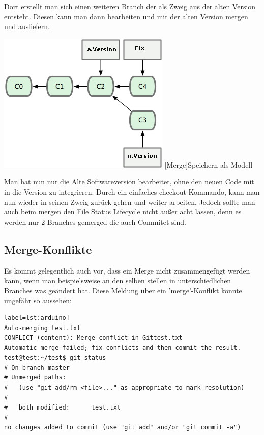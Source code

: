 \documentclass[12pt,a4paper,bibliography=totocnumbered,listof=totocnumbered]{scrartcl}
\begin{document}
Dort erstellt man sich einen weiteren Branch der als Zweig aus der alten Version entsteht. Diesen kann man dann bearbeiten und mit der alten Version mergen und ausliefern.
 
\vspace{1em}
\begin{minipage}{\linewidth}
	\centering
	\includegraphics[width=0.6\linewidth]{Bilder/merge-fix.png}
	[Merge]{Speichern als Modell\footnotemark }
	\label{Speichern als Modell}
\end{minipage}

Man hat nun nur die Alte Softwareversion bearbeitet, ohne den neuen Code 
mit in die Version zu integrieren. Durch ein einfaches checkout Kommando, kann man nun wieder in seinen Zweig zurück gehen und weiter arbeiten. Jedoch sollte man auch beim mergen den File Status Lifecycle nicht außer acht lassen, denn es werden nur 2 Branches gemerged die auch Commitet sind.

\subsection{Merge-Konflikte}
Es kommt gelegentlich auch vor, dass ein Merge nicht zusammengefügt werden kann, wenn man beispielsweise an den selben stellen in unterschiedlichen Branches was geändert hat.	
Diese Meldung über ein 'merge'-Konflikt könnte ungefähr so aussehen:

\begin{lstlisting}[caption=Branch Konfilkt] label=lst:arduino]
Auto-merging test.txt
CONFLICT (content): Merge conflict in Gittest.txt
Automatic merge failed; fix conflicts and then commit the result.
test@test:~/test$ git status
# On branch master
# Unmerged paths:
#   (use "git add/rm <file>..." as appropriate to mark resolution)
#
#	both modified:      test.txt
#
no changes added to commit (use "git add" and/or "git commit -a")
\end{lstlisting}
\end{document}
